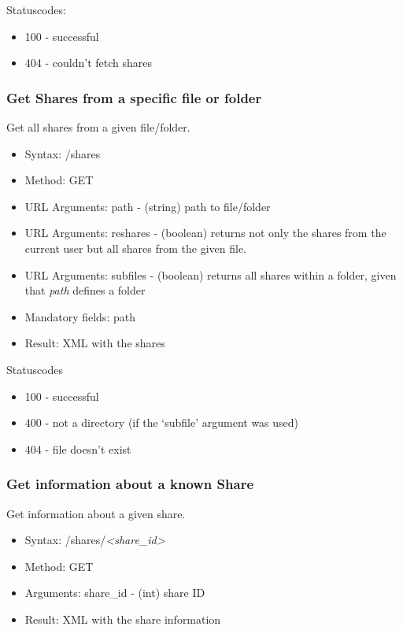 \documentclass[letterpaper,10pt,english]{sphinxmanual}
\begin{document}
Statuscodes:
\begin{itemize}
\item {} 
100 - successful

\item {} 
404 - couldn't fetch shares

\end{itemize}


\subsubsection{Get Shares from a specific file or folder}
\label{core/ocs-share-api:get-shares-from-a-specific-file-or-folder}
Get all shares from a given file/folder.
\begin{itemize}
\item {} 
Syntax: /shares

\item {} 
Method: GET

\item {} 
URL Arguments: path - (string) path to file/folder

\item {} 
URL Arguments: reshares - (boolean) returns not only the shares from the current user but all shares from the given file.

\item {} 
URL Arguments: subfiles - (boolean) returns all shares within a folder, given that
\emph{path} defines a folder

\item {} 
Mandatory fields: path

\item {} 
Result: XML with the shares

\end{itemize}

Statuscodes
\begin{itemize}
\item {} 
100 - successful

\item {} 
400 - not a directory (if the `subfile' argument was used)

\item {} 
404 - file doesn't exist

\end{itemize}


\subsubsection{Get information about a known Share}
\label{core/ocs-share-api:get-information-about-a-known-share}
Get information about a given share.
\begin{itemize}
\item {} 
Syntax: /shares/\emph{\textless{}share\_id\textgreater{}}

\item {} 
Method: GET

\item {} 
Arguments: share\_id - (int) share ID

\item {} 
Result: XML with the share information

\end{itemize}
\end{document}
